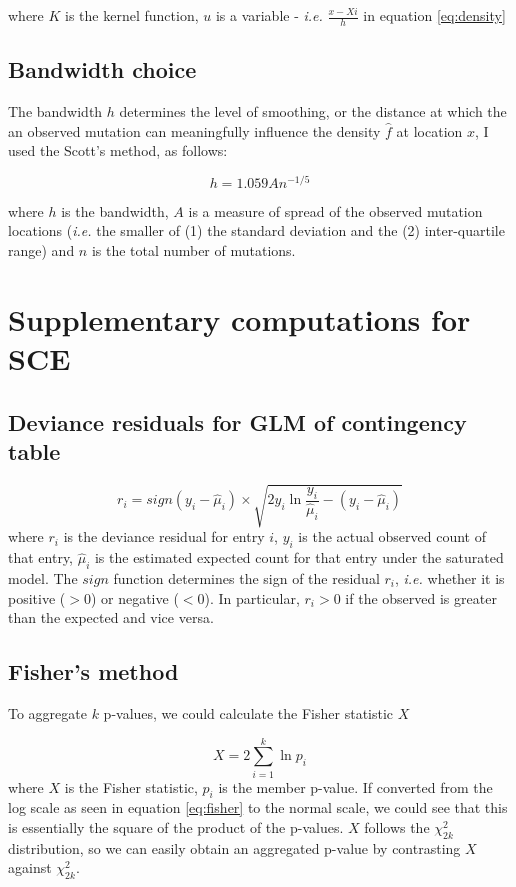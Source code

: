 where $K$ is the kernel function, $u$ is a variable - \textit{i.e.} $\frac{x-X{i}}{h}$ in equation \ref{eq:density}

\subsection{Bandwidth choice}
The bandwidth $h$ determines the level of smoothing, or the distance at which the an observed mutation can meaningfully influence the density $\hat{f}$ at location $x$, I used the Scott's method, as follows:

\begin{equation}
    h = 1.059 A n^{-1/5}
    \label{eq:bandwidth}
\end{equation}

where $h$ is the bandwidth, $A$ is a measure of spread of the observed mutation locations (\textit{i.e.} the smaller of (1) the standard deviation and the (2) inter-quartile range) and $n$ is the total number of mutations.


\newpage
\section{Supplementary computations for SCE}

\subsection{Deviance residuals for GLM of contingency table}
\begin{equation}
    r_i = sign(y_i - \hat{\mu}_i) \times \sqrt{2y_i\ln{\frac{y_i}{\hat{\mu}_i}} - (y_i - \hat{\mu}_i)}
    \label{eq:dev_res}
\end{equation}
where $r_i$ is the deviance residual for entry $i$, $y_i$ is the actual observed count of that entry, $\hat{\mu}_i$ is the estimated expected count for that entry under the saturated model. The $sign$ function determines the sign of the residual $r_i$, \textit{i.e.} whether it is positive ($>$0) or negative ($<$0). In particular, $r_i>0$ if the observed is greater than the expected and vice versa. 

\subsection{Fisher's method}\label{apdx:fisher}
To aggregate $k$ p-values, we could calculate the Fisher statistic $X$

\begin{equation}
    X = 2 \sum_{i=1}^k \ln{p_i}
    \label{eq:fisher}
\end{equation}
where $X$ is the Fisher statistic, $p_i$ is the member p-value. If converted from the log scale as seen in equation \ref{eq:fisher} to the normal scale, we could see that this is essentially the square of the product of the p-values. $X$ follows the $\chi^2_{2k}$ distribution, so we can easily obtain an aggregated p-value by contrasting $X$ against $\chi^2_{2k}$.

